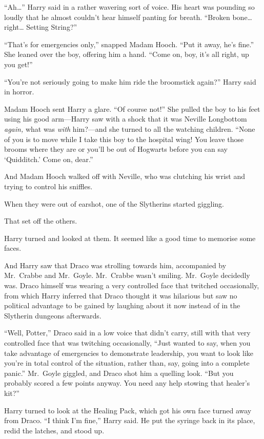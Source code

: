 ``Ah\ldots{}'' Harry said in a rather wavering sort of voice. His heart
was pounding so loudly that he almost couldn't hear himself panting for
breath. ``Broken bone\ldots{} right\ldots{} Setting String?''

``That's for emergencies only,'' snapped Madam Hooch. ``Put it away,
he's fine.'' She leaned over the boy, offering him a hand. ``Come on,
boy, it's all right, up you get!''

``You're not seriously going to make him ride the broomstick again?''
Harry said in horror.

Madam Hooch sent Harry a glare. ``Of course not!'' She pulled the boy to
his feet using his good arm---Harry saw with a shock that it was Neville
Longbottom \emph{again,} what was \emph{with} him?---and she turned to
all the watching children. ``None of you is to move while I take this
boy to the hospital wing! You leave those brooms where they are or
you'll be out of Hogwarts before you can say `Quidditch.' Come on,
dear.''

And Madam Hooch walked off with Neville, who was clutching his wrist and
trying to control his sniffles.

When they were out of earshot, one of the Slytherins started giggling.

That set off the others.

Harry turned and looked at them. It seemed like a good time to memorise
some faces.

And Harry saw that Draco was strolling towards him, accompanied by
Mr.~Crabbe and Mr.~Goyle. Mr.~Crabbe wasn't smiling. Mr.~Goyle decidedly
was. Draco himself was wearing a very controlled face that twitched
occasionally, from which Harry inferred that Draco thought it was
hilarious but saw no political advantage to be gained by laughing about
it now instead of in the Slytherin dungeons afterwards.

``Well, Potter,'' Draco said in a low voice that didn't carry, still
with that very controlled face that was twitching occasionally, ``Just
wanted to say, when you take advantage of emergencies to demonstrate
leadership, you want to look like you're in total control of the
situation, rather than, say, going into a complete panic.'' Mr.~Goyle
giggled, and Draco shot him a quelling look. ``But you probably scored a
few points anyway. You need any help stowing that healer's kit?''

Harry turned to look at the Healing Pack, which got his own face turned
away from Draco. ``I think I'm fine,'' Harry said. He put the syringe
back in its place, redid the latches, and stood up.

